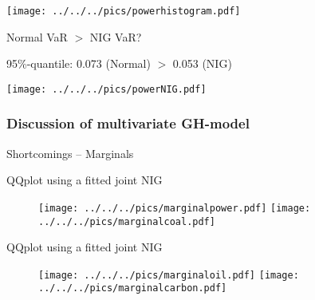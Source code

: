 	\begin{center}
	\texttt{[image: ../../../pics/powerhistogram.pdf]}
	\end{center}

	\begin{center}
	Normal VaR $>$ NIG VaR?
	\end{center}
	95\%-quantile: \hspace{1cm} 0.073 (Normal) \hspace{1cm}$>$ \hspace{1cm} 0.053 (NIG) \\

	\begin{center}
	\texttt{[image: ../../../pics/powerNIG.pdf]}
	\end{center}

 
\subsubsection{Discussion of multivariate GH-model}
Shortcomings -- Marginals %
	\begin{center}
	QQplot using a fitted joint NIG
	\begin{figure}
	\begin{center}
	\texttt{[image: ../../../pics/marginalpower.pdf]}
	\texttt{[image: ../../../pics/marginalcoal.pdf]}
	\end{center}
	\end{figure}
	\end{center}

	\begin{center}
	QQplot using a fitted joint NIG
	\begin{figure}
	\begin{center}
	\texttt{[image: ../../../pics/marginaloil.pdf]}
	\texttt{[image: ../../../pics/marginalcarbon.pdf]}
	\end{center}
	\end{figure}
	\end{center}

